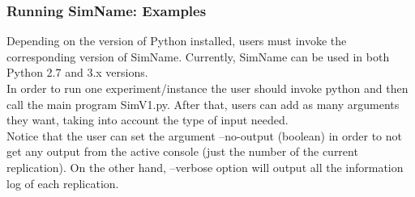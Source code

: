 \documentclass[11pt]{article}
\begin{document}
\subsubsection{Running SimName: Examples}
Depending on the version of Python installed, users must invoke the corresponding version of SimName. Currently, SimName can be used in both Python 2.7 and 3.x versions. \\

In order to run one experiment/instance the user should invoke python and then call the main program SimV1.py. After that, users can add as many arguments they want, taking into account the type of input needed. \\

Notice that the user can set the argument --no-output (boolean) in order to not get any output from the active console (just the number of the current replication). On the other hand, --verbose option will output all the information log of each replication.
\end{document}
